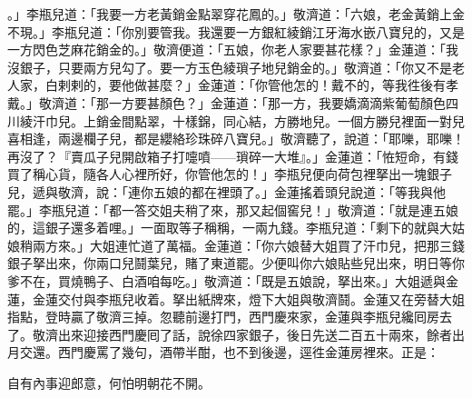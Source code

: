 。」李瓶兒道：「我要一方老黃銷金點翠穿花鳳的。」敬濟道：「六娘，老金黃銷上金不現。」李瓶兒道：「你別要管我。我還要一方銀紅綾銷江牙海水嵌八寶兒的，又是一方閃色芝麻花銷金的。」敬濟便道：「五娘，你老人家要甚花樣？」金蓮道：「我沒銀子，只要兩方兒勾了。要一方玉色綾瑣子地兒銷金的。」敬濟道：「你又不是老人家，白剌剌的，要他做甚麼？」金蓮道：「你管他怎的！戴不的，等我徃後有孝戴。」{}敬濟道：「那一方要甚顏色？」金蓮道：「那一方，我要嬌滴滴紫葡萄顏色四川綾汗巾兒。上銷金間點翠，十樣錦，同心結，方勝地兒。一個方勝兒裡面一對兒喜相逢，兩邊欄子兒，都是纓絡珍珠碎八寶兒。」敬濟聽了，說道：「耶嚛，耶嚛！再沒了？『賣瓜子兒開啟箱子打嚏噴——瑣碎一大堆』。」金蓮道：「恠短命，有錢買了稱心貨，隨各人心裡所好，你管他怎的！」李瓶兒便向荷包裡拏出一塊銀子兒，遞與敬濟，說：「連你五娘的都在裡頭了。」金蓮搖着頭兒說道：「等我與他罷。」{}李瓶兒道：「都一答交姐夫稍了來，那又起個窖兒！」敬濟道：「就是連五娘的，這銀子還多着哩。」一面取等子稱稱，一兩九錢。李瓶兒道：「剩下的就與大姑娘稍兩方來。」大姐連忙道了萬福。金蓮道：「你六娘替大姐買了汗巾兒，把那三錢銀子拏出來，你兩口兒鬪葉兒，賭了東道罷。{}少便叫你六娘貼些兒出來，{}明日等你爹不在，買燒鴨子、白酒咱每吃。」敬濟道：「既是五娘說，拏出來。」大姐遞與金蓮，金蓮交付與李瓶兒收着。拏出紙牌來，燈下大姐與敬濟鬪。金蓮又在旁替大姐指點，登時贏了敬濟三掉。忽聽前邊打門，西門慶來家，金蓮與李瓶兒纔囘房去了。敬濟出來迎接西門慶囘了話，說徐四家銀子，後日先送二百五十兩來，餘者出月交還。西門慶罵了幾句，酒帶半酣，也不到後邊，逕徃金蓮房裡來。正是：

自有內事迎郎意，何怕明朝花不開。

